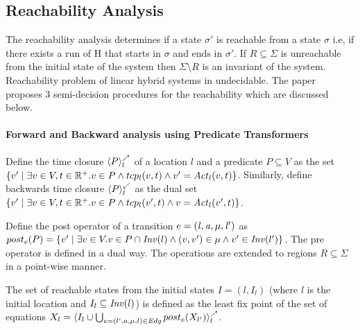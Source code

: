 \subsection{\textbf{Reachability Analysis}}

The reachability analysis determines if a state $\sigma'$ is reachable from a state $\sigma$ i.e, if there exists
a run of H that starts in $\sigma$ and ends in $\sigma'$. If $R \subseteq \Sigma$ is unreachable from the initial state of the system then $\Sigma \setminus R$ is an invariant of the system.
Reachability problem of linear hybrid systems in undecidable. The paper proposes 3 semi-decision procedures for the reachability which are discussed below.

\paragraph*{\textbf{Forward and Backward analysis using Predicate Transformers}}

Define the time closure $\langle P \rangle^{\nearrow}_{l}$ of a location $l$ and a predicate $P \subseteq V$ as the set
$\{ v' \; | \; \exists v \in V,t \in \mathbb{R}^+. v \in P \wedge tcp_l(v,t) \wedge v' = \mathit{Act}_l(v,t) \}$.
Similarly, define backwards time closure $\langle P \rangle^{\swarrow}_{l}$ as the dual set 
$\{ v' \; | \; \exists v \in V,t \in \mathbb{R}^+. v \in P \wedge tcp_l(v',t) \wedge v = \mathit{Act}_l(v',t) \}$.

Define the post operator of a transition $e = \mathit{(l,a,\mu,l')}$ as 
$post_e(P) = \{ v' \; | \; \exists v \in V. v \in P \cap \mathit{Inv}(l) \wedge (v,v') \in \mu \wedge v' \in \mathit{Inv}(l') \}$.
The pre operator is defined in a dual way.
The operations are extended to regions $R \subseteq \Sigma$ in a point-wise manner.

The set of reachable states from the initial states $I = (l,I_l)$ (where $l$ is the initial location
and $I_l \subseteq \mathit{Inv}(l)$) 
is defined as the least fix point of the set of equations 
$X_l = \langle I_l \cup \bigcup_{e=(l',a,\mu,l) \in \mathit{Edg}} post_e(X_{l'}) \rangle^{\nearrow}_{l}$.

